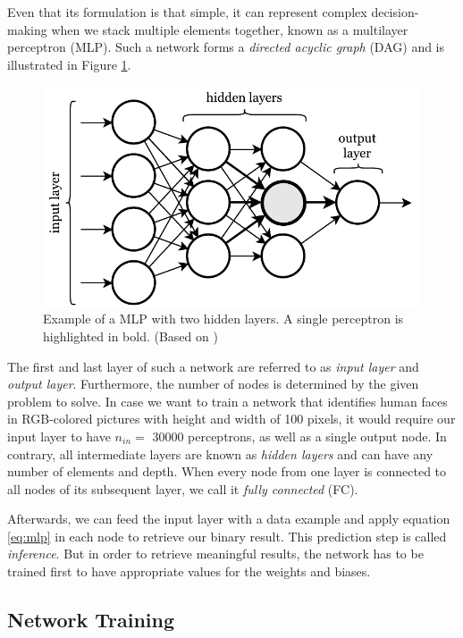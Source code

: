 Even that its formulation is that simple, it can represent complex decision-making when we stack multiple elements together, known as a multilayer perceptron (MLP). Such a network forms a \textit{directed acyclic graph} (DAG) and is illustrated in Figure \ref{fig:mlp}.

\begin{figure}[htpb]
	\centering
	\includegraphics[width=.75\linewidth]{figures/mlp.pdf}
	\caption[Multilayer Perceptron]{Example of a MLP with two hidden layers. A single perceptron is highlighted in bold. (Based on \parencite{neural_nets_deep_learning})} \label{fig:mlp}
\end{figure}

The first and last layer of such a network are referred to as \textit{input layer} and \textit{output layer}. Furthermore, the number of nodes is determined by the given problem to solve. In case we want to train a network that identifies human faces in RGB-colored pictures with height and width of 100 pixels, it would require our input layer to have $ n_{in}=$ \num{30000} perceptrons, as well as a single output node. In contrary, all intermediate layers are known as \textit{hidden layers} and can have any number of elements and depth. When every node from one layer is connected to all nodes of its subsequent layer, we call it \textit{fully connected} (FC).

Afterwards, we can feed the input layer with a data example and apply equation \ref{eq:mlp} in each node to retrieve our binary result. This prediction step is called \textit{inference}. But in order to retrieve meaningful results, the network has to be trained first to have appropriate values for the weights and biases.

\subsection{Network Training}


